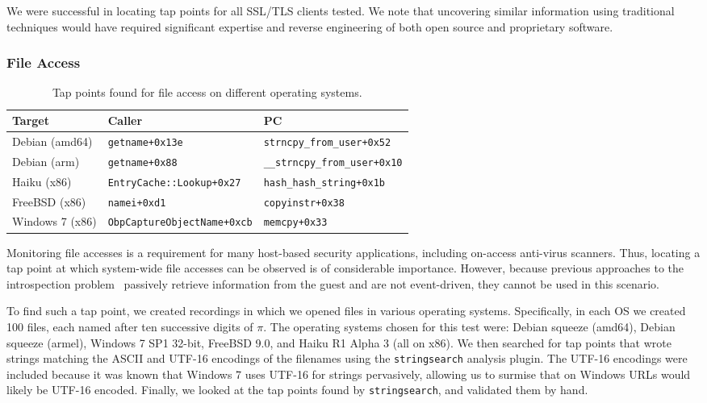 We were successful in locating tap points for all SSL/TLS clients tested.
We note that uncovering similar information using traditional techniques
would have required significant expertise and reverse engineering of
both open source and proprietary software.

\subsubsection{File Access}
\label{sec:eval:subsec:file}

\begin{table*}
    \centering
    \small
    \begin{tabular}{|l|l|l|}
        \hline
        Target & Caller & PC \\
        \hline
        Debian (amd64) & \texttt{getname+0x13e} & \texttt{strncpy\_from\_user+0x52} \\ 
        Debian (arm) & \texttt{getname+0x88} & \texttt{\_\_strncpy\_from\_user+0x10} \\
        Haiku (x86) & \texttt{EntryCache::Lookup+0x27} & \texttt{hash\_hash\_string+0x1b} \\
        FreeBSD (x86) & \texttt{namei+0xd1} & \texttt{copyinstr+0x38} \\
        Windows 7 (x86) & \texttt{ObpCaptureObjectName+0xcb} & \texttt{memcpy+0x33} \\
        \hline
    \end{tabular}
\caption{Tap points found for file access on different operating systems.}
\label{tbl:file}
\end{table*}

Monitoring file accesses is a requirement for many host-based security
applications, including on-access anti-virus scanners. Thus, locating a
tap point at which system-wide file accesses can be observed is of
considerable importance. However, because previous approaches to the
introspection problem~\cite{Dolan-Gavitt:2011uq,Fu:2012fk} passively
retrieve information from the guest and are not event-driven, they
cannot be used in this scenario.

To find such a tap point, we created recordings in which we opened files
in various operating systems. Specifically, in each OS we created 100
files, each named after ten successive digits of $\pi$. The operating
systems chosen for this test were: Debian squeeze (amd64), Debian
squeeze (armel), Windows 7 SP1 32-bit, FreeBSD 9.0, and Haiku R1 Alpha
3 (all on x86). We then searched for tap points that wrote strings
matching the ASCII and UTF-16 encodings of the filenames using the
\texttt{stringsearch} analysis plugin. The UTF-16 encodings were
included because it was known that Windows 7 uses UTF-16 for strings
pervasively, allowing us to surmise that on Windows URLs would likely be
UTF-16 encoded. Finally, we looked at the tap points found by
\texttt{stringsearch}, and validated them by hand.

